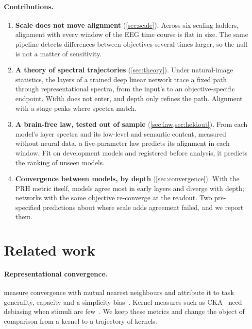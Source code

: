 \documentclass[10pt]{article}
\theoremstyle{plain}
\theoremstyle{definition}
\theoremstyle{remark}
\begin{document}
\paragraph{Contributions.}
\begin{enumerate}
  \item \textbf{Scale does not move alignment} (\cref{sec:scale}). Across six scaling ladders,
    alignment with every window of the EEG time course is flat in size. The same pipeline
    detects differences between objectives several times larger, so the null is not a matter
    of sensitivity.
  \item \textbf{A theory of spectral trajectories} (\cref{sec:theory}). Under natural-image
    statistics, the layers of a trained deep linear network trace a fixed path through
    representational spectra, from the input's to an objective-specific endpoint. Width does
    not enter, and depth only refines the path. Alignment with a stage peaks where spectra match.
  \item \textbf{A brain-free law, tested out of sample} (\cref{sec:law,sec:heldout}). From each
    model's layer spectra and its low-level and semantic content, measured without neural data,
    a five-parameter law predicts its alignment in each window. Fit on development models and
    registered before analysis, it predicts the ranking of \vNheld{} unseen models.
  \item \textbf{Convergence between models, by depth} (\cref{sec:convergence}). With the PRH
    metric itself, models agree most in early layers and diverge with depth; networks with the
    same objective re-converge at the readout. Two pre-specified predictions about where scale
    adds agreement failed, and we report them.
\end{enumerate}

\section{Related work}
\label{sec:related}

\paragraph{Representational convergence.} \citet{huh2024platonic} measure convergence with mutual
nearest neighbours and attribute it to task generality, capacity and a simplicity
bias~\citep{huh2023lowrank}. Kernel measures such as CKA~\citep{kornblith2019cka} need debiasing
when stimuli are few~\citep{song2012hsic,murphy2024cka}. We keep these metrics and change the
object of comparison from a kernel to a trajectory of kernels.
\end{document}
